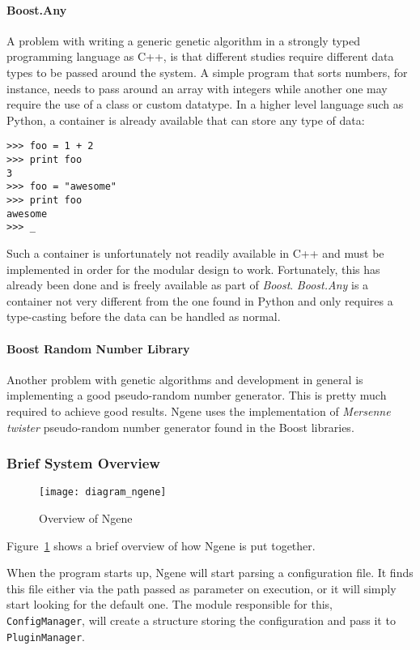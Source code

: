 \paragraph{\textbf{Boost.Any}}\cite{henney2001}
A problem with writing a generic genetic algorithm in a strongly typed programming language as C++, is that different studies require different data types to be passed around the system. A simple program that sorts numbers, for instance, needs to pass around an array with integers while another one may require the use of a class or custom datatype. In a higher level language such as Python, a container is already available that can store any type of data:

\begin{verbatim}
>>> foo = 1 + 2
>>> print foo
3
>>> foo = "awesome"
>>> print foo
awesome
>>> _
\end{verbatim}

Such a container is unfortunately not readily available in C++ and must be implemented in order for the modular design to work. Fortunately, this has already been done and is freely available as part of \emph{Boost}. \emph{Boost.Any} is a container not very different from the one found in Python and only requires a type-casting before the data can be handled as normal.

\paragraph{\textbf{Boost Random Number Library}}\cite{maurer2000}
Another problem with genetic algorithms and development in general is implementing a good pseudo-random number generator. This is pretty much required to achieve good results. Ngene uses the implementation of \emph{Mersenne twister} pseudo-random number generator found in the Boost libraries.

\subsubsection{Brief System Overview}
\begin{figure}[ht]
	\centering
	\texttt{[image: diagram\_ngene]}
	\caption{Overview of Ngene}
	\label{fig:diagram_ngene}
\end{figure}

Figure~\ref{fig:diagram_ngene} shows a brief overview of how Ngene is put together.

When the program starts up, Ngene will start parsing a configuration file. It finds this file either via the path passed as parameter on execution, or it will simply start looking for the default one. The module responsible for this, \texttt{ConfigManager}, will create a structure storing the configuration and pass it to \texttt{PluginManager}.

